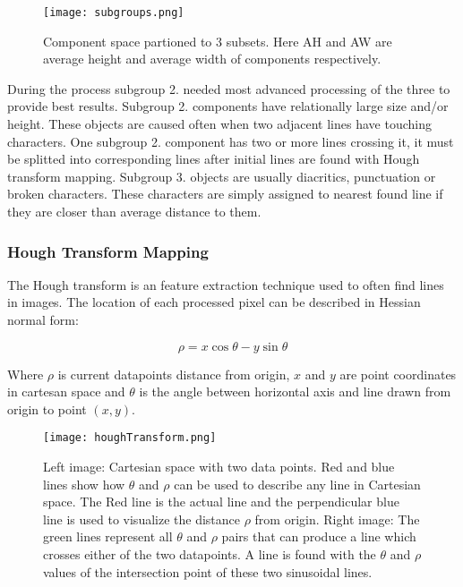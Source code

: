 \documentclass{article}
\begin{document}
            \begin{figure}[!ht]
              \centering
              \texttt{[image: subgroups.png]}
              \caption{Component space partioned to 3 subsets. Here AH and AW are average height and average width of components respectively.\cite{Louloudis1} \label{fig:subgroupspace}}
            \end{figure}

            During the process subgroup 2. needed most advanced processing of the three to provide best results. Subgroup 2. components have relationally large size and/or height. These objects are caused often when two adjacent lines have touching characters. One subgroup 2. component has two or more lines crossing it, it must be splitted into corresponding lines after initial lines are found with Hough transform mapping. Subgroup 3. objects are usually diacritics, punctuation or broken characters. These characters are simply assigned to nearest found line if they are closer than average distance to them.

          \subsubsection{Hough Transform Mapping}
          \label{sec:houghtransformmapping}
            The Hough transform is an feature extraction technique used to often find lines in images. The location of each processed pixel can be described in Hessian normal form:

            \begin{equation}
              \rho = x \cos \theta - y \sin \theta
            \end{equation}

            Where $\rho$ is current datapoints distance from origin, $x$ and $y$ are point coordinates in cartesan space and $\theta$ is the angle between horizontal axis and line drawn from origin to point $(x,y)$.

            \begin{figure}[!ht]
              \centering
              \texttt{[image: houghTransform.png]}
              \caption{ Left image: Cartesian space with two data points. Red and blue lines show how $\theta$ and $\rho$ can be used to describe any line in Cartesian space. The Red line is the actual line and the perpendicular blue line is used to visualize the distance $\rho$ from origin. Right image: The green lines represent all $\theta$ and $\rho$ pairs that can produce a line which crosses either of the two datapoints. A line is found with the $\theta$ and $\rho$ values of the intersection point of these two sinusoidal lines. \label{fig:houghtransform}}
            \end{figure}
\end{document}
